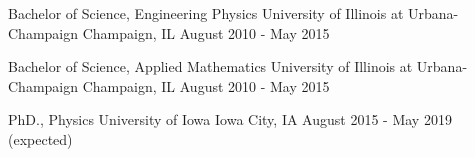 
\begin{cventries}

  \cventry
    {Bachelor of Science, Engineering Physics} %
    {University of Illinois at Urbana-Champaign} %
    {Champaign, IL} %
    {August 2010 - May 2015} %
    {}
    \vspace{-2ex}

    \cventry
    {Bachelor of Science, Applied Mathematics} %
    {University of Illinois at Urbana-Champaign} %
    {Champaign, IL} %
    {August 2010 - May 2015} %
    {}
    \vspace{-2ex}

    \cventry
    {PhD., Physics} %
    {University of Iowa}
    {Iowa City, IA}
    {August 2015 - May 2019 (expected)}
    {}
    \vspace{-2ex}

\end{cventries}
